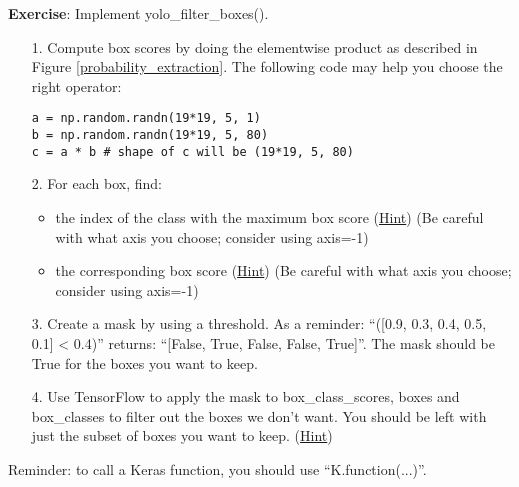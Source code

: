 {\textbf {Exercise}}: Implement yolo\_filter\_boxes().
\begin{itemize} 
\item[1.] Compute box scores by doing the elementwise product as described in Figure \ref{probability_extraction}. The following code may help you choose the right operator: 
\begin{verbatim}
a = np.random.randn(19*19, 5, 1)
b = np.random.randn(19*19, 5, 80)
c = a * b # shape of c will be (19*19, 5, 80)
\end{verbatim}
\item[2.] For each box, find:
    \begin{itemize} 
    \item the index of the class with the maximum box score (\href{https://keras.io/backend/#argmax}{Hint}) (Be careful with what axis you choose; consider using axis=-1)
    \item the corresponding box score (\href{https://keras.io/backend/#max}{Hint}) (Be careful with what axis you choose; consider using axis=-1)
    \end{itemize}
\item[3.] Create a mask by using a threshold. As a reminder: ``([0.9, 0.3, 0.4, 0.5, 0.1] < 0.4)'' returns: ``[False, True, False, False, True]''. The mask should be True for the boxes you want to keep. 
\item[4.] Use TensorFlow to apply the mask to box\_class\_scores, boxes and box\_classes to filter out the boxes we don't want. You should be left with just the subset of boxes you want to keep. (\href{https://www.tensorflow.org/api_docs/python/tf/boolean_mask}{Hint})
\end{itemize}
Reminder: to call a Keras function, you should use ``K.function(...)''.

